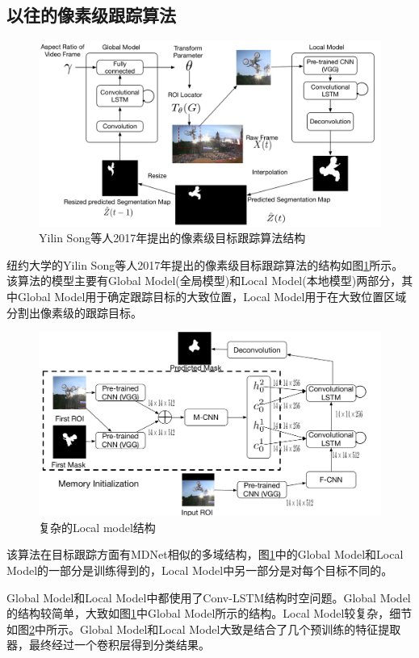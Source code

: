 \subsection{以往的像素级跟踪算法} \label{section:pixel_wise_vot_2017_intro}
\begin{figure}[htbp!]
    \centering
    \includegraphics[width = 1.\textwidth]{chap/img/Tracking_framework.pdf}
    \caption{Yilin Song等人2017年提出的像素级目标跟踪算法结构\supercite{DBLP:journals/corr/abs-1711-07377}}
    \label{fig:pixel_level_vot_2017}
\end{figure}
\par
纽约大学的Yilin Song等人2017年提出的像素级目标跟踪算法的结构如图\ref{fig:pixel_level_vot_2017}所示。该算法的模型主要有Global Model(全局模型)和Local Model(本地模型)两部分，其中Global Model用于确定跟踪目标的大致位置，Local Model用于在大致位置区域分割出像素级的跟踪目标。
\par
\begin{figure}[htbp!]
    \centering
    \includegraphics[width = 1.\textwidth]{chap/img/Local.pdf}
    \caption{复杂的Local model结构\supercite{DBLP:journals/corr/abs-1711-07377}}
    \label{fig:local_model}
\end{figure}
\par
该算法在目标跟踪方面有MDNet相似的多域结构，图\ref{fig:pixel_level_vot_2017}中的Global Model和Local Model的一部分是训练得到的，Local Model中另一部分是对每个目标不同的。
\par
Global Model和Local Model中都使用了Conv-LSTM结构时空问题。Global Model的结构较简单，大致如图\ref{fig:pixel_level_vot_2017}中Global Model所示的结构。Local Model较复杂，细节如图\ref{fig:local_model}中所示。Global Model和Local Model大致是结合了几个预训练的特征提取器，最终经过一个卷积层得到分类结果。

